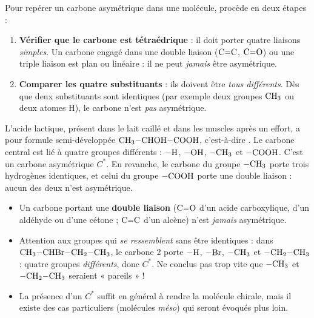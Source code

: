 \documentclass[11pt]{article}
\newcommand{\cle}[1]{{\popxbold\color{popdark}#1}}
\begin{document}
\begin{methode}
Pour repérer un carbone asymétrique dans une molécule, procède en deux étapes :
\begin{enumerate}
\item \textbf{Vérifier que le carbone est tétraédrique} : il doit porter quatre liaisons \emph{simples}. Un carbone engagé dans une double liaison ($\ce{C=C}$, $\ce{C=O}$) ou une triple liaison est plan ou linéaire : il ne peut \emph{jamais} être asymétrique.
\item \textbf{Comparer les quatre substituants} : ils doivent être \emph{tous différents}. Dès que deux substituants sont identiques (par exemple deux groupes $\ce{CH3}$ ou deux atomes H), le carbone n'est \emph{pas} asymétrique.
\end{enumerate}
\end{methode}

\begin{exemplebox}
L'\cle{acide lactique}, présent dans le lait caillé et dans les muscles après un effort, a pour formule semi-développée $\ce{CH3-CHOH-COOH}$, c'est-à-dire . Le carbone central est lié à quatre groupes différents : $\ce{-H}$, $\ce{-OH}$, $\ce{-CH3}$ et $\ce{-COOH}$. C'est un carbone asymétrique $C^*$. En revanche, le carbone du groupe $\ce{-CH3}$ porte trois hydrogènes identiques, et celui du groupe $\ce{-COOH}$ porte une double liaison : aucun des deux n'est asymétrique.
\end{exemplebox}

\begin{attention}
\begin{itemize}
\item Un carbone portant une \textbf{double liaison} ($\ce{C=O}$ d'un acide carboxylique, d'un aldéhyde ou d'une cétone ; $\ce{C=C}$ d'un alcène) n'est \emph{jamais} asymétrique.
\item Attention aux groupes qui \emph{se ressemblent} sans être identiques : dans $\ce{CH3-CHBr-CH2-CH3}$, le carbone 2 porte $\ce{-H}$, $\ce{-Br}$, $\ce{-CH3}$ et $\ce{-CH2-CH3}$ : quatre groupes \emph{différents}, donc $C^*$. Ne conclus pas trop vite que $\ce{-CH3}$ et $\ce{-CH2-CH3}$ seraient « pareils » !
\item La présence d'un $C^*$ suffit en général à rendre la molécule chirale, mais il existe des cas particuliers (molécules \emph{méso}) qui seront évoqués plus loin.
\end{itemize}
\end{attention}
\end{document}
